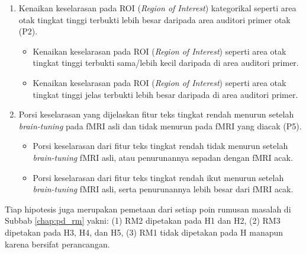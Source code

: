 \begin{enumerate}[label=H\arabic*.]
\begin{itemize}
        \item[$H_{1}$:] Perubahan pada lapisan awal hingga tengah jelas lebih besar daripada lapisan di atasnya dan juga jelas lebih besar daripada model bahasa saja.
    \end{itemize}
    \item Kenaikan keselarasan pada ROI (\textit{Region of Interest}) kategorikal seperti area otak tingkat tinggi terbukti lebih besar daripada area auditori primer otak (P2).
    \begin{itemize}
        \item[$H_{0}$:] Kenaikan keselarasan pada ROI (\textit{Region of Interest}) seperti area otak tingkat tinggi terbukti sama/lebih kecil daripada di area auditori primer.
        \item[$H_{1}$:] Kenaikan keselarasan pada ROI (\textit{Region of Interest}) seperti area otak tingkat tinggi jelas terbukti lebih besar daripada di area auditori primer.
    \end{itemize}
    \item Porsi keselarasan yang dijelaskan fitur teks tingkat rendah menurun setelah \textit{brain-tuning} pada fMRI asli dan tidak menurun pada fMRI yang diacak (P5).
    \begin{itemize}
        \item[$H_{0}$:] Porsi keselarasan dari fitur teks tingkat rendah tidak menurun setelah \textit{brain-tuning} fMRI asli, atau penurunannya sepadan dengan fMRI acak.
        \item[$H_{1}$:] Porsi keselarasan dari fitur teks tingkat rendah ikut menurun setelah \textit{brain-tuning} fMRI asli, serta penurunannya lebih besar dari fMRI acak.
    \end{itemize}
\end{enumerate}

Tiap hipotesis juga merupakan pemetaan dari setiap poin rumusan masalah di Subbab \ref{chap:pd_rm} yakni: (1) RM2 dipetakan pada H1 dan H2, (2) RM3 dipetakan pada H3, H4, dan H5, (3) RM1 tidak dipetakan pada H manapun karena bersifat perancangan.
\vfill


